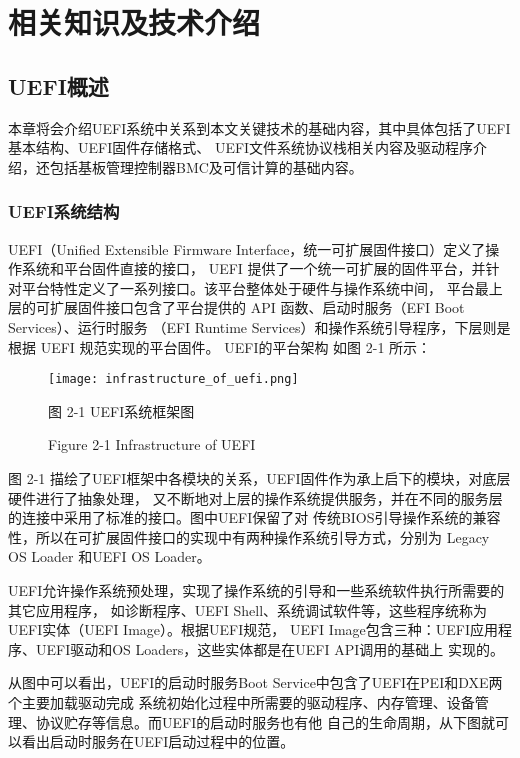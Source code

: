 %
%
\chapter{相关知识及技术介绍}

%
%
\section{UEFI概述}
本章将会介绍UEFI系统中关系到本文关键技术的基础内容，其中具体包括了UEFI基本结构、UEFI固件存储格式、
UEFI文件系统协议栈相关内容及驱动程序介绍，还包括基板管理控制器BMC及可信计算的基础内容。

\subsection{UEFI系统结构}
UEFI（Unified Extensible Firmware Interface，统一可扩展固件接口）定义了操作系统和平台固件直接的接口，
UEFI 提供了一个统一可扩展的固件平台，并针对平台特性定义了一系列接口。该平台整体处于硬件与操作系统中间，
平台最上层的可扩展固件接口包含了平台提供的 API 函数、启动时服务（EFI  Boot  Services）、运行时服务
（EFI  Runtime Services）和操作系统引导程序\cite{english21}，下层则是根据 UEFI 规范实现的平台固件。
UEFI的平台架构
如图 2-1 所示：

\begin{figure}[htb]
    \vspace{0cm}
    \setlength{\abovecaptionskip}{0.3cm}
	\centering
    \texttt{[image: infrastructure\_of\_uefi.png]}
    \caption*{图 2-1 UEFI系统框架图}
    \setlength{\belowcaptionskip}{-0.7cm}
    \caption*{Figure 2-1 Infrastructure of UEFI}
\end{figure}

\par 图 2-1 描绘了UEFI框架中各模块的关系，UEFI固件作为承上启下的模块，对底层硬件进行了抽象处理，
又不断地对上层的操作系统提供服务，并在不同的服务层的连接中采用了标准的接口。图中UEFI保留了对
传统BIOS引导操作系统的兼容性，所以在可扩展固件接口的实现中有两种操作系统引导方式，分别为
Legacy OS Loader 和UEFI OS Loader。 
\par UEFI允许操作系统预处理，实现了操作系统的引导和一些系统软件执行所需要的其它应用程序，
如诊断程序、UEFI Shell、系统调试软件等，这些程序统称为UEFI实体（UEFI Image）。根据UEFI规范，
UEFI Image包含三种：UEFI应用程序、UEFI驱动和OS Loaders，这些实体都是在UEFI API调用的基础上
实现的。
\par 从图中可以看出，UEFI的启动时服务Boot Service中包含了UEFI在PEI和DXE两个主要加载驱动完成
系统初始化过程中所需要的驱动程序、内存管理、设备管理、协议贮存等信息。而UEFI的启动时服务也有他
自己的生命周期，从下图就可以看出启动时服务在UEFI启动过程中的位置\cite{chinese20}。

